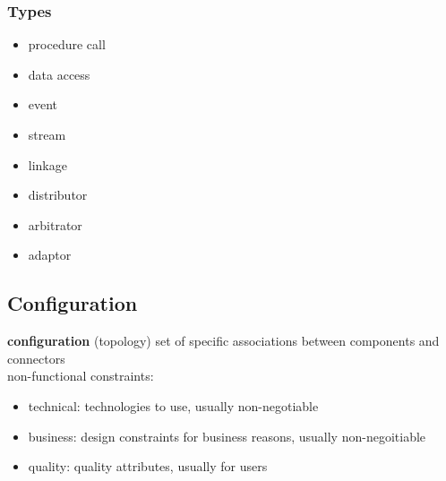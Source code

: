 \documentclass[]{article}
\theoremstyle{definition}
\begin{document}
	\subsubsection{Types}
	\begin{itemize}
		\item procedure call
		\item data access
		\item event
		\item stream
		\item linkage
		\item distributor
		\item arbitrator
		\item adaptor
	\end{itemize}

	\subsection{Configuration}
	\textbf{configuration} (topology) set of specific associations between components and connectors \\

	non-functional constraints:
	\begin{itemize}
		\item technical: technologies to use, usually non-negotiable
		\item business: design constraints for business reasons, usually non-negoitiable
		\item quality: quality attributes, usually for users
	\end{itemize}
\end{document}
